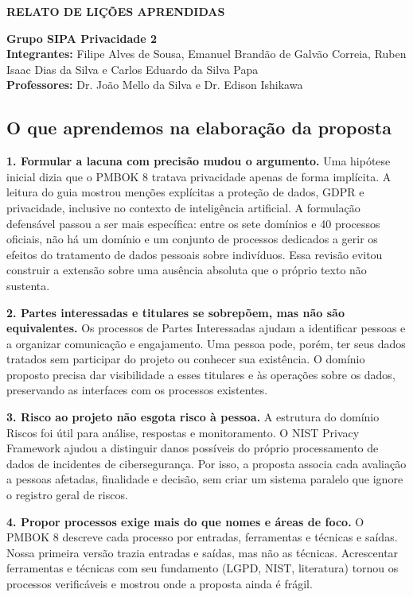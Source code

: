 \documentclass[12pt,a4paper,article,oneside,english,brazil]{abntex2}
\begin{document}
\SingleSpacing
\thispagestyle{plain}

\begin{center}\textbf{RELATO DE LIÇÕES APRENDIDAS}\end{center}

\textbf{Grupo SIPA Privacidade 2}\\ \textbf{Integrantes:} Filipe Alves de Sousa, Emanuel Brandão de Galvão Correia, Ruben Isaac Dias da Silva e Carlos Eduardo da Silva Papa\\ \textbf{Professores:} Dr. João Mello da Silva e Dr. Edison Ishikawa

\subsection*{O que aprendemos na elaboração da proposta}

\textbf{1. Formular a lacuna com precisão mudou o argumento.} Uma hipótese inicial dizia que o PMBOK 8 tratava privacidade apenas de forma implícita. A leitura do guia mostrou menções explícitas a proteção de dados, GDPR e privacidade, inclusive no contexto de inteligência artificial. A formulação defensável passou a ser mais específica: entre os sete domínios e 40 processos oficiais, não há um domínio e um conjunto de processos dedicados a gerir os efeitos do tratamento de dados pessoais sobre indivíduos. Essa revisão evitou construir a extensão sobre uma ausência absoluta que o próprio texto não sustenta.

\textbf{2. Partes interessadas e titulares se sobrepõem, mas não são equivalentes.} Os processos de Partes Interessadas ajudam a identificar pessoas e a organizar comunicação e engajamento. Uma pessoa pode, porém, ter seus dados tratados sem participar do projeto ou conhecer sua existência. O domínio proposto precisa dar visibilidade a esses titulares e às operações sobre os dados, preservando as interfaces com os processos existentes.

\textbf{3. Risco ao projeto não esgota risco à pessoa.} A estrutura do domínio Riscos foi útil para análise, respostas e monitoramento. O NIST Privacy Framework ajudou a distinguir danos possíveis do próprio processamento de dados de incidentes de cibersegurança. Por isso, a proposta associa cada avaliação a pessoas afetadas, finalidade e decisão, sem criar um sistema paralelo que ignore o registro geral de riscos.

\textbf{4. Propor processos exige mais do que nomes e áreas de foco.} O PMBOK 8 descreve cada processo por entradas, ferramentas e técnicas e saídas. Nossa primeira versão trazia entradas e saídas, mas não as técnicas. Acrescentar ferramentas e técnicas com seu fundamento (LGPD, NIST, literatura) tornou os processos verificáveis e mostrou onde a proposta ainda é frágil.
\end{document}
